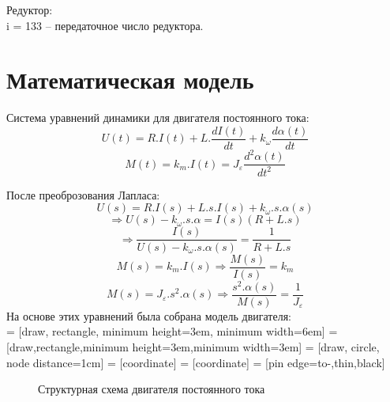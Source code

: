 \documentclass[a4paper,12pt]{article}
\begin{document}
Редуктор:\\
i = 133 – передаточное число редуктора.

\newpage
\section{ Математическая модель}
Система уравнений динамики для двигателя постоянного тока:
$$U(t)=R.I(t)+L.\frac{dI(t)}{dt}+k_\omega \frac{d\alpha(t)}{dt}$$
$$M(t)=k_m.I(t)=J_\varepsilon \frac{d^2 \alpha(t)}{dt^2}$$

После преоброзования Лапласа:
$$U(s)=R.I(s)+L.s.I(s)+k_\omega .s.\alpha(s)$$
$$\Rightarrow U(s)-k_\omega.s.\alpha=I(s)(R+L.s)$$
$$\Rightarrow \frac{I(s)}{U(s)-k_\omega.s.\alpha(s)}=\frac{1}{R+L.s}$$
$$M(s)=k_m.I(s)\Rightarrow \frac{M(s)}{I(s)}=k_m$$
$$M(s)=J_\varepsilon.s^2.\alpha(s)\Rightarrow\frac{s^2.\alpha(s)}{M(s)}=\frac{1}{J_\varepsilon}$$
На основе этих уравнений была собрана модель двигателя:
\\

 = [draw, rectangle, 
    minimum height=3em, minimum width=6em]
=[draw,rectangle,minimum height=3em,minimum width=3em]
 = [draw, circle, node distance=1cm]
 = [coordinate]
 = [coordinate]
 = [pin edge={to-,thin,black}]

\begin{figure}[h]
    \centering
    \caption{Структурная схема двигателя постоянного тока}
    \label{fig:my_label}
\end{figure}
\end{document}
